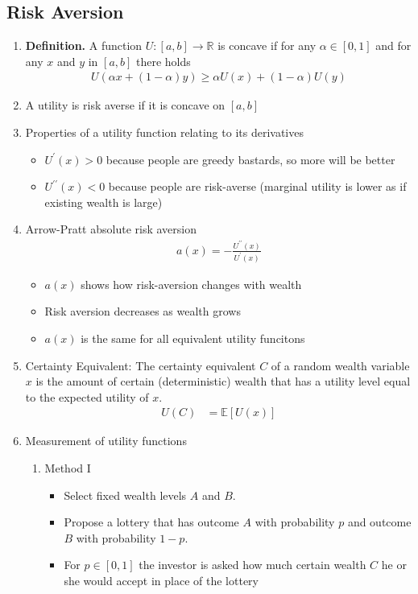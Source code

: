 \documentclass[12pt,twoside]{article}
\begin{document}
\subsection{Risk Aversion}
\begin{enumerate}
	\item \textbf{Definition.} A function $U: [a,b] \rightarrow \mathbb{R}$ is concave if for any $\alpha \in [0,1]$ and for any $x$ and $y$ in $[a,b]$ there holds 
	\begin{align*}
		U\left(\alpha x + (1-\alpha) y\right) \geq \alpha U(x)  + (1-\alpha) U(y)
	\end{align*}

	\item A utility is risk averse if it is concave on $[a,b]$

	\item Properties of a utility function relating to its derivatives
		\begin{itemize}
			\item $U^\prime(x)>0$ because people are greedy bastards, so more will be better
			\item $U^{\prime\prime}(x) < 0$  because people are risk-averse (marginal utility is lower as if existing wealth is large)
		\end{itemize}

	\item Arrow-Pratt absolute risk aversion 
	\begin{align*}
		a(x) = - \frac{U^{\prime\prime}(x)}{U^\prime(x)}
	\end{align*}
	
		\begin{itemize}
			\item $a(x)$ shows how risk-aversion changes with wealth
			\item Risk aversion decreases as wealth grows
			\item $a(x)$ is the same for all equivalent utility funcitons
		\end{itemize}
		
	\item Certainty Equivalent: The certainty equivalent $C$ of a random wealth variable $x$ is the amount of certain (deterministic) wealth that has a utility level equal to the expected utility of $x$.
	\begin{align*}
		U(C) 	& = \mathbb{E}[U(x)]
	\end{align*}
	
	\item Measurement of utility functions
		\begin{enumerate}
			\item Method I
				\begin{itemize}
					\item Select fixed wealth levels $A$ and $B$.
					\item Propose a lottery that has outcome $A$ with probability $p$ and outcome $B$ with probability $1-p$.
					\item For $p\in [0,1]$ the investor is asked how much certain wealth $C$ he or she would accept in place of the lottery
				\end{itemize}
										

\end{enumerate}
\end{enumerate}
\end{document}
